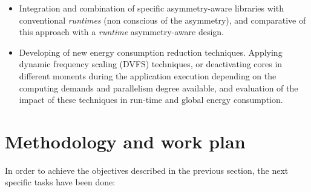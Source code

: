 \begin{itemize}
\item Integration and combination of specific asymmetry-aware libraries
  with conventional \emph{runtimes}  (non conscious of the asymmetry), and
  comparative of this approach with a \emph{runtime} asymmetry-aware
  design.

\item Developing of new energy consumption reduction techniques. Applying
  dynamic frequency scaling (DVFS) techniques, or deactivating cores in
  different moments during the application execution depending on the
  computing demands and parallelism degree available, and evaluation of the
  impact of these techniques in run-time and global energy consumption.
\end{itemize}









\section*{Methodology and work plan}

In order to achieve the objectives described in the previous section, the
next specific tasks have been done:

